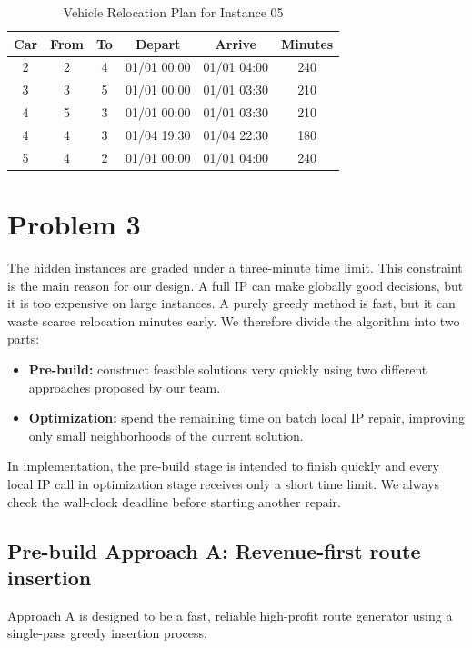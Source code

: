 \documentclass[10pt,a4paper]{article}
\begin{document}
\begin{table}[htbp]
\centering
\caption{Vehicle Relocation Plan for Instance 05} \label{tab:reloc_plan} 
\begin{tabular}{cccccc}
\toprule
Car & From & To & Depart & Arrive & Minutes \\
\midrule
2 & 2 & 4 & 01/01 00:00 & 01/01 04:00 & 240 \\
3 & 3 & 5 & 01/01 00:00 & 01/01 03:30 & 210 \\
4 & 5 & 3 & 01/01 00:00 & 01/01 03:30 & 210 \\
4 & 4 & 3 & 01/04 19:30 & 01/04 22:30 & 180 \\
5 & 4 & 2 & 01/01 00:00 & 01/01 04:00 & 240 \\
\bottomrule
\end{tabular}
\end{table}

\section*{Problem 3}

The hidden instances are graded under a three-minute time limit.  This constraint
is the main reason for our design.  A full IP can make globally good decisions,
but it is too expensive on large instances.  A purely greedy method is fast, but
it can waste scarce relocation minutes early.  We therefore divide the algorithm into two parts:

\begin{itemize}[itemsep=2pt, parsep=0pt, topsep=4pt]
    \item \textbf{Pre-build:} construct feasible solutions very quickly
    using two different approaches proposed by our team.
    \item \textbf{Optimization:} spend the remaining time on batch local IP
    repair, improving only small neighborhoods of the current solution.
\end{itemize}
In implementation, the pre-build stage is intended to finish quickly and every
local IP call in optimization stage receives only a short time limit.  We always check the wall-clock deadline before starting another repair.

\subsection*{Pre-build Approach A: Revenue-first route insertion}

Approach A is designed to be a fast, reliable high-profit route generator using a single-pass greedy insertion process:
\end{document}
